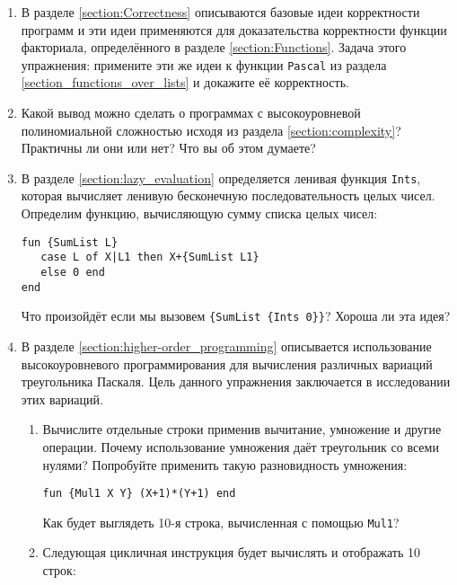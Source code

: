\begin{enumerate}
{}

\item{В разделе \ref{section:Correctness} описываются базовые идеи корректности программ и эти идеи применяются для доказательства корректности функции факториала, определённого в разделе \ref{section:Functions}. Задача этого упражнения: примените эти же идеи к функции \lstinline|Pascal| из раздела \ref{section_functions_over_lists} и докажите её корректность.}

\item{Какой вывод можно сделать о программах с высокоуровневой полиномиальной сложностью исходя из раздела \ref{section:complexity}? Практичны ли они или нет? Что вы об этом думаете?}

\item{В разделе \ref{section:lazy_evaluation} определяется ленивая функция \lstinline|Ints|, которая вычисляет ленивую бесконечную последовательность целых чисел. Определим функцию, вычисляющую сумму списка целых чисел:

\begin{lstlisting}
fun {SumList L}
   case L of X|L1 then X+{SumList L1}
   else 0 end
end
\end{lstlisting}

Что произойдёт если мы вызовем \lstinline|{SumList {Ints 0}}|? Хороша ли эта идея?
}

\item{
В разделе \ref{section:higher-order_programming} описывается использование высокоуровневого программирования для вычисления различных вариаций треугольника Паскаля. Цель данного упражнения заключается в исследовании этих вариаций.

\begin{enumerate}

\item{
Вычислите отдельные строки применив вычитание, умножение и другие операции. Почему использование умножения даёт треугольник со всеми нулями? Попробуйте применить такую разновидность умножения:

\begin{lstlisting}
fun {Mul1 X Y} (X+1)*(Y+1) end
\end{lstlisting}

Как будет выглядеть 10-я строка, вычисленная с помощью \lstinline|Mul1|?
 
}

 \item{ 
Следующая цикличная инструкция будет вычислять и отображать 10 строк:

}
\end{enumerate}}
\end{enumerate}
